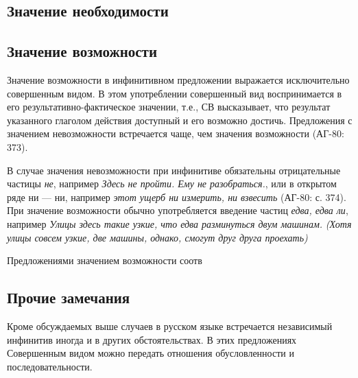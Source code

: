 

\subsection{Значение необходимости}


\subsection{Значение возможности}

Значение возможности в инфинитивном предложении выражается исключительно совершенным видом. В этом употреблении совершенный вид воспринимается в его результативно-фактическое значении, т.е., СВ высказывает, что результат указанного глаголом действия доступный и его возможно достичь. Предложения с значением невозможности встречается чаще, чем значения возможности (АГ-80: 373). 

В случае значения невозможности при инфинитиве обязательны отрицательные частицы \textit{не}, например \textit{Здесь не пройти. Ему не разобраться.}, или в открытом ряде ни --- ни, например \textit{этот ущерб ни измерить, ни взвесить} (АГ-80: с. 374). При значение возможности обычно употребляется введение частиц \textit{едва, едва ли}, например \textit{Улицы здесь такие узкие, что едва разминуться двум машинам.} \textit{(Хотя улицы совсем узкие, две машины, однако, смогут друг друга проехать)}

Предложениями значением возможности соотв

\subsection{Прочие замечания}

Кроме обсуждаемых выше случаев в русском языке встречается независимый инфинитив иногда и в других обстоятельствах. В этих предложениях Совершенным видом можно передать отношения обусловленности и последовательности. 